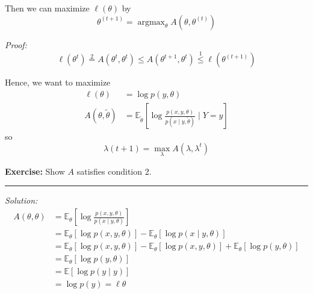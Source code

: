 \documentclass[12pt]{report}
\newcommand{\E}{\mathbb{E}}
\renewcommand{\div}{\vspace*{10pt}\hrule\vspace*{10pt}}
\DeclareMathOperator*{\argmax}{\arg\max}
\newenvironment*{tbox}[2][gray]{
    \begin{tcolorbox}[
        parbox=false,
        colback=#1!5!white,
        colframe=#1!75!black,
        breakable,
        title={#2}
    ]}
    {\end{tcolorbox}}
\newenvironment*{exercise}[1][red]{
    \begin{tcolorbox}[
        parbox=false,
        colback=#1!5!white,
        colframe=#1!75!black,
        breakable
    ]}
    {\end{tcolorbox}}
\begin{document}
Then we can maximize $\ell(\theta)$ by
\[\theta^{(t + 1)} = \argmax_{\theta} A(\theta, \theta^{(t)})\]

\begin{tbox}{\textbf{Claim:} $\ell(\theta^{(t)}) \leq \ell(\theta^{(t+1)})$ }
	\emph{Proof:}
	\[\ell(\theta^t) \overset{2}{=} A(\theta^t, \theta^t) \leq A(\theta^{t+1}, \theta^{t}) \overset{1}{\leq} \ell(\theta^{(t+1)})\]
\end{tbox}

Hence, we want to maximize
\begin{align*}
	\ell(\theta)             & = \log p(y, \theta)                                                                                       \\
	A(\theta, \tilde \theta) & = \E_{\tilde \theta}\left[\log \frac{p(x, y, \theta)}{p(x \; | \; y, \tilde \theta)} \; | \; Y = y\right]
\end{align*}
so
\[\lambda(t+1) = \max_{\lambda} A(\lambda, \lambda^t)\]

\begin{exercise}
	\textbf{Exercise:} Show $A$ satisfies condition 2.

	\div

	\emph{Solution:}
	\begin{align*}
		A(\theta, \theta) & = \E_{\theta} \left[\log \frac{p(x, y, \theta)}{p(x \; | \; y, \theta)}\right]                                                   \\
		                  & = \E_{\theta} \left[\log p(x, y, \theta)\right] - \E_{\theta} \left[\log p(x \; | \; y, \theta)\right]                           \\
		                  & = \E_{\theta} \left[\log p(x, y, \theta)\right] - \E_{\theta} \left[\log p(x, y, \theta)\right] + \E_{\theta}[\log p(y, \theta)] \\
		                  & = \E_{\theta}[\log p(y, \theta)]                                                                                                 \\
		                  & = \E[\log p(y \; | \; y)]                                                                                                        \\
		                  & = \log p(y) = \ell \theta
	\end{align*}
\end{exercise}
\end{document}

